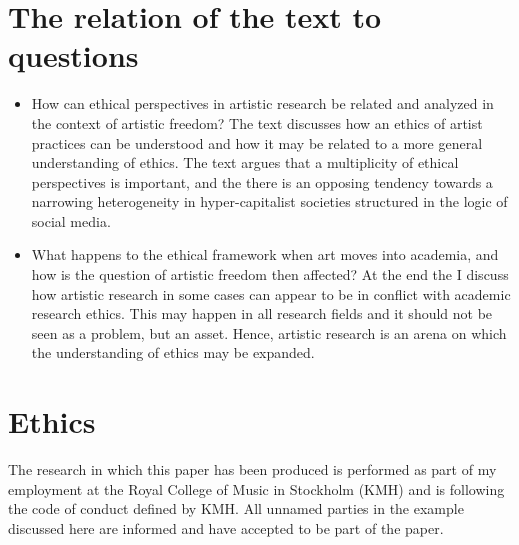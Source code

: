 \documentclass[11pt]{article}
\begin{document}
\section*{The relation of the text to questions}
\label{sec:org1f9bad6}
\begin{itemize}
\item How can ethical perspectives in artistic research be related and analyzed in the context of artistic freedom?
The text discusses how an ethics of artist practices can be understood and how it may be related to a more general understanding of ethics. The text argues that a multiplicity of ethical perspectives is important, and the there is an opposing tendency towards a narrowing heterogeneity in hyper-capitalist societies structured in the logic of social media.
\item What happens to the ethical framework when art moves into academia, and how is the question of artistic freedom then affected?
At the end the I discuss how artistic research in some cases can appear to be in conflict with academic research ethics. This may happen in all research fields and it should not be seen as a problem, but an asset. Hence, artistic research is an arena on which the understanding of ethics may be expanded.
\end{itemize}
\section*{Ethics}
\label{sec:org51b0b52}
The research in which this paper has been produced is performed as part of my employment at the Royal College of Music in Stockholm (KMH) and is following the code of conduct defined by KMH. All unnamed parties in the example discussed here are informed and have accepted to be part of the paper.
\end{document}
